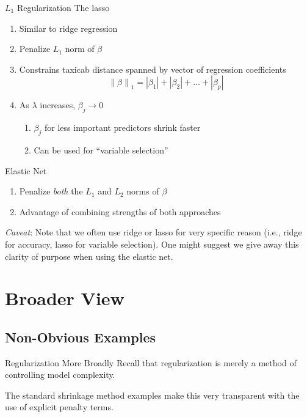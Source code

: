 \documentclass[pdf]{beamer}
\newcommand\norm[1]{\left\lVert#1\right\rVert}
\begin{document}
		\begin{frame}{$L_1$ Regularization}
		The lasso
		\begin{enumerate}
			\item Similar to ridge regression
			\item Penalize $L_1$ norm of $\beta$
			\item Constrains taxicab distance spanned by vector of regression coefficients
			$$ \norm{\beta}_1 = \left|\beta_{1}\right| + \left|\beta_{2}\right| + ... + \left|\beta_{p}\right| $$
			\item As $\lambda$ increases, $\beta_j \rightarrow 0$ 
				\begin{enumerate}[1]
					\item $\beta_j$ for less important predictors shrink faster
					\item Can be used for ``variable selection''
				\end{enumerate}
		\end{enumerate}
		\end{frame}

		\begin{frame}{Elastic Net}
		\begin{enumerate}
			\item Penalize \emph{both} the $L_1$ and ${L_2}$ norms of $\beta$
			\item Advantage of combining strengths of both approaches
		\end{enumerate}
		
		\vspace{2em} 
		
		\textit{Caveat}: Note that we often use ridge or lasso for very specific reason (i.e., ridge for accuracy, lasso for variable selection). One might suggest we give away this clarity of purpose when using the elastic net. 
		\end{frame}

\section{Broader View}
	\subsection{Non-Obvious Examples}
		\begin{frame}{Regularization More Broadly}
		Recall that regularization is merely a method of controlling model complexity. \newline 
		
		The standard shrinkage method examples make this very transparent with the use of explicit penalty terms. 
		\end{frame}	
		
\end{document}

